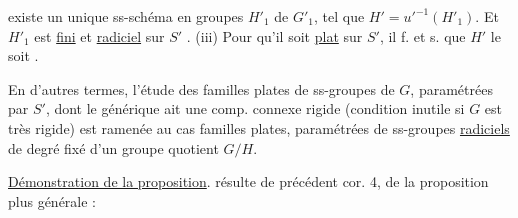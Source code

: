 \margin{\rule[-4\baselineskip]{0.35pt}{4\baselineskip}}existe un unique ss-schéma en groupes 
$H'_1$ de $G'_1$, tel que $H'={u'}^{-1}(H'_1)$.  Et $H'_1$ est  \uline{fini}  et \uline{radiciel}
sur $S'$ .
(iii) Pour qu'il soit \uline{plat} sur $S'$, il f. et s. que $H'$ le soit \unsure{$\varnothing$|$\varphi$}.

En d'autres termes, l'étude des
 familles plates de ss-groupes
de $G$, paramétrées par $S'$, dont le
 générique ait une comp. connexe
rigide (condition inutile si $G$ est
très rigide) est ramenée au cas 
 familles plates, paramétrées
 de ss-groupes \uline{radiciels} de
degré fixé d'un groupe quotient
$G/H$. 


\uline{Démonstration de la proposition}. 
résulte de  précédent cor. 4,
 de la proposition plus générale :
